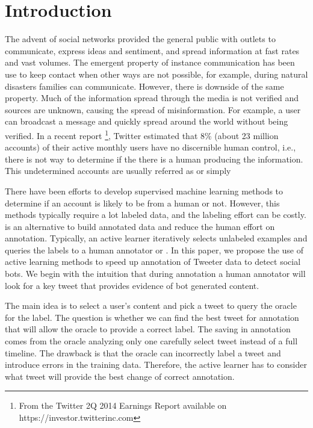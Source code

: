 
\section{Introduction}

The advent of social networks provided the general public with outlets to communicate, express ideas and sentiment, and spread information at fast rates and vast volumes. The emergent property of instance communication has been use to keep contact when other ways are not possible, for example, during natural disasters families can communicate. However, there is downside of the same property. Much of the information spread through the media is not verified and sources are unknown, causing the spread of misinformation. For example, a user can broadcast a message and quickly spread around the world without being verified. In a recent report \footnote{From the Twitter 2Q 2014 Earnings Report available on https://investor.twitterinc.com}, Twitter estimated that 8\% (about 23 million accounts) of their active monthly users have no discernible human control, i.e., there is not way to determine if the there is a human producing the information. This undetermined accounts are usually referred as  or simply 

There have been efforts to develop supervised machine learning methods to determine if an account is likely to be from a human or not. However, this methods typically require a lot labeled data, and the labeling effort can be costly.  is an alternative to build annotated data and reduce the human effort on annotation. Typically, an active learner iteratively selects unlabeled examples and queries the labels to a human annotator or . In this paper, we propose the use of active learning methods to speed up annotation of Tweeter data to detect social bots. We begin with the intuition that during annotation a human annotator will look for a key tweet that provides evidence of bot generated content. 

The main idea is to select a user's content and pick a tweet to query the oracle for the label. The question is whether we can find the best tweet for annotation that will allow the oracle to provide a correct label. The saving in annotation comes from the oracle analyzing only one carefully select tweet instead of a full timeline. The drawback is that the oracle can incorrectly label a tweet and introduce errors in the training data. Therefore, the active learner has to consider what tweet will provide the best change of correct annotation. 

